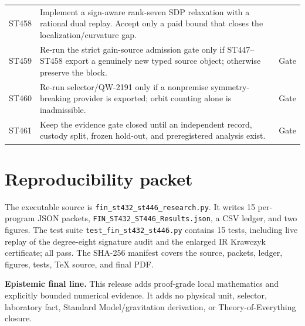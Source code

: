 \documentclass[11pt,a4paper]{article}
\begin{document}
\begin{longtable}{>{\raggedright\arraybackslash}p{}>{\raggedright\arraybackslash}p{}>{\raggedright\arraybackslash}p{}}
ST458&Implement a sign-aware rank-seven SDP relaxation with a rational dual replay.  Accept only a paid bound that closes the localization/curvature gap.&2\\
ST459&Re-run the strict gain-source admission gate only if ST447--ST458 export a genuinely new typed source object; otherwise preserve the block.&Gate\\
ST460&Re-run selector/QW-2191 only if a nonpremise symmetry-breaking provider is exported; orbit counting alone is inadmissible.&Gate\\
ST461&Keep the evidence gate closed until an independent record, custody split, frozen hold-out, and preregistered analysis exist.&Gate\\
\bottomrule
\end{longtable}

\section{Reproducibility packet}

The executable source is \texttt{fin\_st432\_st446\_research.py}.  It writes
15 per-program JSON packets, \texttt{FIN\_ST432\_ST446\_Results.json}, a CSV
ledger, and two figures.  The test suite
\texttt{test\_fin\_st432\_st446.py} contains 15 tests, including live replay
of the degree-eight signature audit and the enlarged IR Krawczyk certificate;
all pass.  The SHA-256 manifest covers the source, packets, ledger, figures,
tests, TeX source, and final PDF.

\medskip
\noindent\textbf{Epistemic final line.}  This release adds proof-grade local
mathematics and explicitly bounded numerical evidence.  It adds no physical
unit, selector, laboratory fact, Standard Model/gravitation derivation, or
Theory-of-Everything closure.
\end{document}
